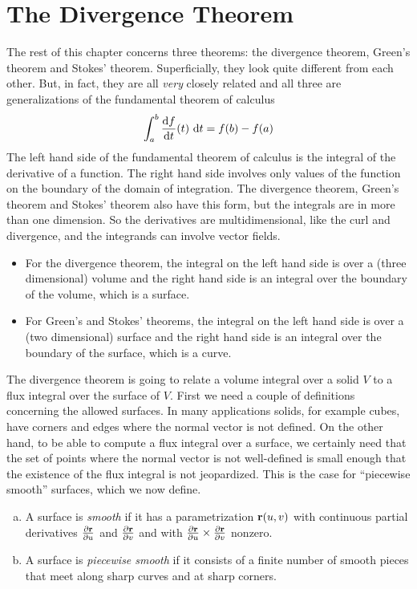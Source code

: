 \section{The Divergence Theorem}\label{sec:divergenceThm}
The rest of this chapter concerns three theorems: the divergence theorem,
Green's theorem and Stokes' theorem. Superficially, they look
quite different from each other. But, in fact, they are all \emph{very} 
closely related and all three are generalizations of the 
fundamental theorem of calculus
\begin{equation*}
\int_a^b \diff{f}{t}(t)\ \dee{t}
   = f(b) -f(a) 
\end{equation*}
The left hand side of the fundamental theorem of calculus is the 
integral of the derivative of a function.
The right hand side involves only values of the function on the boundary
of the domain of integration. The divergence theorem, Green's theorem
and Stokes' theorem also have this form, but the integrals are in more than 
one dimension. So the derivatives are multidimensional, like the curl
and divergence, and the integrands can involve vector fields.
\begin{itemize}
\item 
For the divergence theorem, the integral on the left hand side is over 
a (three dimensional) volume and the right hand side is an integral
over the boundary of the volume, which is a surface.
\item 
For Green's and Stokes' theorems, the integral on the left hand side is over 
a (two dimensional) surface and the right hand side is an integral
over the boundary of the surface, which is a curve.
\end{itemize}

The divergence theorem is going to relate a volume integral over a solid $V$
to a flux integral over the surface of $V$. First we need a couple of 
definitions concerning the allowed surfaces. In many applications solids,
for example cubes, have corners and edges where the normal vector is not defined. On the other hand, to be able to compute a flux integral over 
a surface, we certainly need that the set of points where  the normal vector
is not well-defined is small enough that the existence of the flux integral
is not jeopardized. This is the case for ``piecewise smooth'' surfaces,
which we now define.
\begin{defn}\label{def:pSmoothSurface}

\begin{enumerate}[(a)]
\item 
A surface is \emph{smooth} if it has a parametrization
$\mathbf{r}(u,v)$ with continuous partial derivatives 
$\frac{\partial\mathbf{r}}{\partial u}$ and $\frac{\partial\mathbf{r}}{\partial v}$
and with $\frac{\partial\mathbf{r}}{\partial u}\times\frac{\partial\mathbf{r}}{\partial v}$
nonzero.

\item 
A surface is \emph{piecewise smooth} if it consists of a finite
number of smooth pieces that meet along sharp curves and at sharp corners.
\end{enumerate}
\end{defn}


